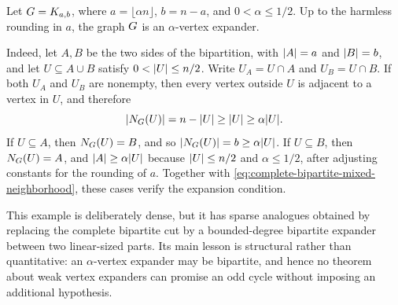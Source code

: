 \begin{example}
	\label{ex:complete-bipartite-expander}
	Let \(G=K_{a,b}\), where \(a=\lfloor \alpha n\rfloor\), \(b=n-a\), and \(0<\alpha\leq 1/2\). Up to the harmless rounding in \(a\), the graph \(G\) is an \(\alpha\)-vertex expander.

	Indeed, let \(A,B\) be the two sides of the bipartition, with \(\lvert A\rvert=a\) and \(\lvert B\rvert=b\), and let \(U\subseteq A\cup B\) satisfy \(0<\lvert U\rvert\leq n/2\). Write \(U_A=U\cap A\) and \(U_B=U\cap B\). If both \(U_A\) and \(U_B\) are nonempty, then every vertex outside \(U\) is adjacent to a vertex in \(U\), and therefore
	\begin{equation}
		\label{eq:complete-bipartite-mixed-neighborhood}
		\lvert N_{G}(U)\rvert=n-\lvert U\rvert\geq \lvert U\rvert\geq \alpha\lvert U\rvert.
	\end{equation}
	If \(U\subseteq A\), then \(N_{G}(U)=B\), and so \(\lvert N_{G}(U)\rvert=b\geq \alpha\lvert U\rvert\). If \(U\subseteq B\), then \(N_{G}(U)=A\), and \(\lvert A\rvert\geq \alpha\lvert U\rvert\) because \(\lvert U\rvert\leq n/2\) and \(\alpha\leq 1/2\), after adjusting constants for the rounding of \(a\). Together with \cref{eq:complete-bipartite-mixed-neighborhood}, these cases verify the expansion condition.

	This example is deliberately dense, but it has sparse analogues obtained by replacing the complete bipartite cut by a bounded-degree bipartite expander between two linear-sized parts. Its main lesson is structural rather than quantitative: an \(\alpha\)-vertex expander may be bipartite, and hence no theorem about weak vertex expanders can promise an odd cycle without imposing an additional hypothesis.
\end{example}

